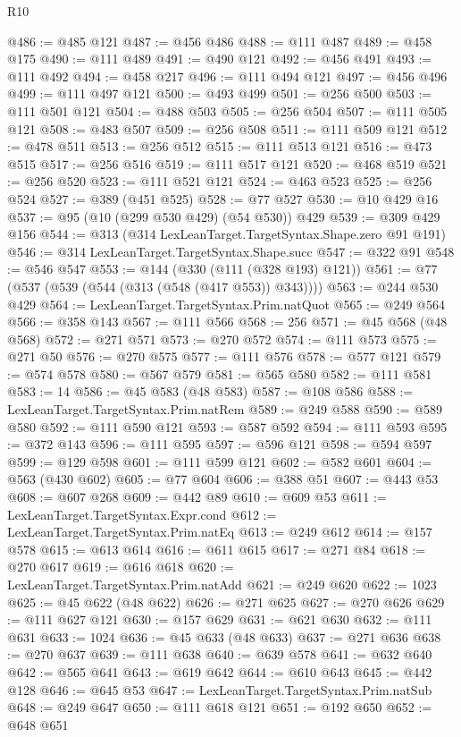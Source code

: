 \begin{lexlean}{R10}
\begin{coremodule}
{{{{{{{{{{{{{{{{{{{{{{{{{{{{{{{{{{{{{{{{{{{{{{{{{{{{{{{{{{{{{{{{{{{{{{{{{{{{{{{{{{{{{{{{{{{{{{{{{{{{{{{{{{{{@486 := @485 @121
@487 := @456 @486
@488 := @111 @487
@489 := @458 @175
@490 := @111 @489
@491 := @490 @121
@492 := @456 @491
@493 := @111 @492
@494 := @458 @217
@496 := @111 @494 @121
@497 := @456 @496
@499 := @111 @497 @121
@500 := @493 @499
@501 := @256 @500
@503 := @111 @501 @121
@504 := @488 @503
@505 := @256 @504
@507 := @111 @505 @121
@508 := @483 @507
@509 := @256 @508
@511 := @111 @509 @121
@512 := @478 @511
@513 := @256 @512
@515 := @111 @513 @121
@516 := @473 @515
@517 := @256 @516
@519 := @111 @517 @121
@520 := @468 @519
@521 := @256 @520
@523 := @111 @521 @121
@524 := @463 @523
@525 := @256 @524
@527 := @389 (@451 @525)
@528 := @77 @527
@530 := @10 @429 @16
@537 := @95 (@10 (@299 @530 @429) (@54 @530)) @429
@539 := @309 @429 @156
@544 := @313 (@314 LexLeanTarget.TargetSyntax.Shape.zero @91 @191)
@546 := @314 LexLeanTarget.TargetSyntax.Shape.succ
@547 := @322 @91
@548 := @546 @547
@553 := @144 (@330 (@111 (@328 @193) @121))
@561 := @77 (@537 (@539 (@544 (@313 (@548 (@417 @553)) @343))))
@563 := @244 @530 @429
@564 := LexLeanTarget.TargetSyntax.Prim.natQuot
@565 := @249 @564
@566 := @358 @143
@567 := @111 @566
@568 := 256
@571 := @45 @568 (@48 @568)
@572 := @271 @571
@573 := @270 @572
@574 := @111 @573
@575 := @271 @50
@576 := @270 @575
@577 := @111 @576
@578 := @577 @121
@579 := @574 @578
@580 := @567 @579
@581 := @565 @580
@582 := @111 @581
@583 := 14
@586 := @45 @583 (@48 @583)
@587 := @108 @586
@588 := LexLeanTarget.TargetSyntax.Prim.natRem
@589 := @249 @588
@590 := @589 @580
@592 := @111 @590 @121
@593 := @587 @592
@594 := @111 @593
@595 := @372 @143
@596 := @111 @595
@597 := @596 @121
@598 := @594 @597
@599 := @129 @598
@601 := @111 @599 @121
@602 := @582 @601
@604 := @563 (@430 @602)
@605 := @77 @604
@606 := @388 @51
@607 := @443 @53
@608 := @607 @268
@609 := @442 @89
@610 := @609 @53
@611 := LexLeanTarget.TargetSyntax.Expr.cond
@612 := LexLeanTarget.TargetSyntax.Prim.natEq
@613 := @249 @612
@614 := @157 @578
@615 := @613 @614
@616 := @611 @615
@617 := @271 @84
@618 := @270 @617
@619 := @616 @618
@620 := LexLeanTarget.TargetSyntax.Prim.natAdd
@621 := @249 @620
@622 := 1023
@625 := @45 @622 (@48 @622)
@626 := @271 @625
@627 := @270 @626
@629 := @111 @627 @121
@630 := @157 @629
@631 := @621 @630
@632 := @111 @631
@633 := 1024
@636 := @45 @633 (@48 @633)
@637 := @271 @636
@638 := @270 @637
@639 := @111 @638
@640 := @639 @578
@641 := @632 @640
@642 := @565 @641
@643 := @619 @642
@644 := @610 @643
@645 := @442 @128
@646 := @645 @53
@647 := LexLeanTarget.TargetSyntax.Prim.natSub
@648 := @249 @647
@650 := @111 @618 @121
@651 := @192 @650
@652 := @648 @651
}}}}}}}}}}}}}}}}}}}}}}}}}}}}}}}}}}}}}}}}}}}}}}}}}}}}}}}}}}}}}}}}}}}}}}}}}}}}}}}}}}}}}}}}}}}}}}}}}}}}}}}}}}}}
\end{coremodule}
\end{lexlean}
